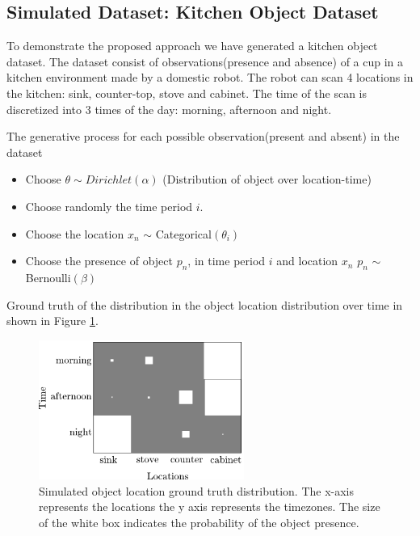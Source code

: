 \subsection{Simulated Dataset: Kitchen Object Dataset}

To demonstrate the proposed approach we have generated a kitchen object dataset. The dataset consist of observations(presence and absence) of a cup in a kitchen environment made by a domestic robot. The robot can scan 4 locations in the kitchen: sink, counter-top, stove and cabinet. The time of the scan is discretized into 3 times of the day: morning, afternoon and night. 

The generative process for each possible observation(present and absent) in the dataset 
\begin{itemize}
    \item Choose $ \theta \sim Dirichlet(\alpha)$ (Distribution of object over location-time)
    \item Choose randomly the time period $i$.
	\item Choose the location $x_n$ $\sim$ Categorical$(\theta_i)$
	\item Choose the presence of object $p_n$, in time period $i$ and location $x_n$  $p_n$ $\sim$ Bernoulli$(\beta) $
\end{itemize}

Ground truth of the distribution in the object location distribution over time in shown in Figure \ref{absent-gt}.


\begin{figure}[htp]
\centering
\includegraphics[width=0.6\textwidth]{images/absent_groundtruth.png}
\caption[Simulated object location ground truth distribution]{Simulated object location ground truth distribution.
The x-axis represents the locations the y axis represents the timezones. The size of the white box indicates the probability of the object presence.}
\label{absent-gt}
\end{figure}

